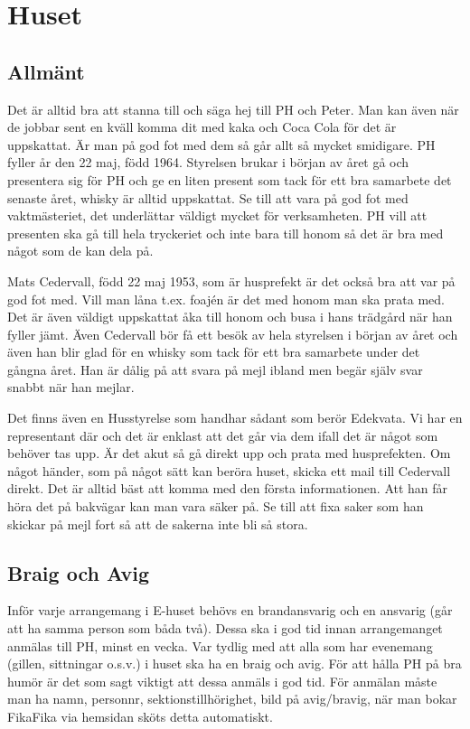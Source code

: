 \documentclass[10pt]{article}
\begin{document}
    \section{Huset}
    
    \subsection{Allmänt}
    
    Det är alltid bra att stanna till och säga hej till PH och Peter. Man kan även när de jobbar sent en kväll komma dit med kaka och Coca Cola för det är uppskattat. Är man på god fot med dem så går allt så mycket smidigare. PH fyller år den 22 maj, född 1964. Styrelsen brukar i början av året gå och presentera sig för PH och ge en liten present som tack för ett bra samarbete det senaste året, whisky är alltid uppskattat. Se till att vara på god fot med vaktmästeriet, det underlättar väldigt mycket för verksamheten. PH vill att presenten ska gå till hela tryckeriet och inte bara till honom så det är bra med något som de kan dela på.
    
    Mats Cedervall, född 22 maj 1953, som är husprefekt är det också bra att var på god fot med. Vill man låna t.ex. foajén är det med honom man ska prata med. Det är även väldigt uppskattat åka till honom och busa i hans trädgård när han fyller jämt. Även Cedervall bör få ett besök av hela styrelsen i början av året och även han blir glad för en whisky som tack för ett bra samarbete under det gångna året. Han är dålig på att svara på mejl ibland men begär själv svar snabbt när han mejlar.
    
    Det finns även en Husstyrelse som handhar sådant som berör Edekvata. Vi har en representant där och det är enklast att det går via dem ifall det är något som behöver tas upp. Är det akut så gå direkt upp och prata med husprefekten. Om något händer, som på något sätt kan beröra huset, skicka ett mail till Cedervall direkt. Det är alltid bäst att komma med den första informationen. Att han får höra det på bakvägar kan man vara säker på. Se till att fixa saker som han skickar på mejl fort så att de sakerna inte bli så stora.
    
    \subsection{Braig och Avig}
    
    Inför varje arrangemang i E-huset behövs en brandansvarig och en ansvarig (går att ha samma person som båda två). Dessa ska i god tid innan arrangemanget anmälas till PH, minst en vecka. Var tydlig med att alla som har evenemang (gillen, sittningar o.s.v.) i huset ska ha en braig och avig. För att hålla PH på bra humör är det som sagt viktigt att dessa anmäls i god tid. För anmälan måste man ha namn, personnr, sektionstillhörighet, bild på avig/bravig, när man bokar FikaFika via hemsidan sköts detta automatiskt.
    
\end{document}
